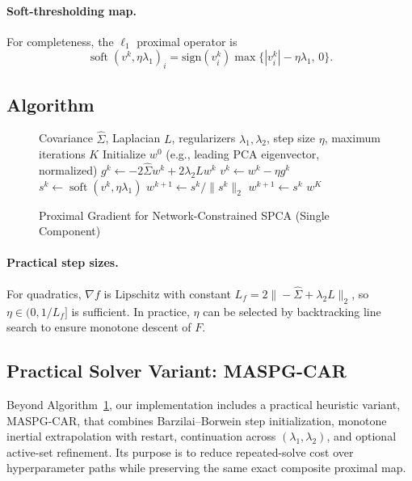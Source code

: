 \documentclass[10pt,twocolumn,letterpaper]{article}
\theoremstyle{definition}
\newcommand{\Sigmahat}{\widehat{\Sigma}}
\DeclareMathOperator{\soft}{soft}
\begin{document}
\paragraph{Soft-thresholding map.}
For completeness, the $\ell_1$ proximal operator is
\begin{equation}
  \soft(v^k,\eta\lambda_1)_i = \mathrm{sign}(v_i^k)\max\{|v_i^k|-\eta\lambda_1,\,0\}.
\end{equation}

\subsection{Algorithm}
\begin{figure}[t]
\centering
\caption{Proximal Gradient for Network-Constrained SPCA (Single Component)}
\label{alg:pg}
\begin{algorithmic}[1]
\Require Covariance $\Sigmahat$, Laplacian $L$, regularizers $\lambda_1,\lambda_2$, step size $\eta$, maximum iterations $K$
\State Initialize $w^0$ (e.g., leading PCA eigenvector, normalized)
  \State $g^k \gets -2\Sigmahat w^k + 2\lambda_2 L w^k$
  \State $v^k \gets w^k - \eta g^k$
  \State $s^k \gets \soft(v^k,\eta\lambda_1)$
    \State $w^{k+1} \gets s^k/\|s^k\|_2$
  \Else
    \State $w^{k+1} \gets s^k$
  \EndIf
\EndFor
\State \Return $w^K$
\end{algorithmic}
\end{figure}

\paragraph{Practical step sizes.}
For quadratics, $\nabla f$ is Lipschitz with constant $L_f = 2\|-\Sigmahat + \lambda_2 L\|_2$, so $\eta\in(0,1/L_f]$ is sufficient. In practice, $\eta$ can be selected by backtracking line search to ensure monotone descent of $F$.

\subsection{Practical Solver Variant: MASPG-CAR}
Beyond Algorithm~\ref{alg:pg}, our implementation includes a practical heuristic variant, MASPG-CAR, that combines Barzilai--Borwein step initialization, monotone inertial extrapolation with restart, continuation across $(\lambda_1,\lambda_2)$, and optional active-set refinement. Its purpose is to reduce repeated-solve cost over hyperparameter paths while preserving the same exact composite proximal map.
\end{document}
